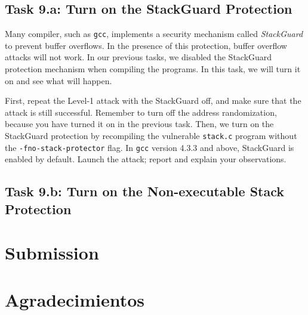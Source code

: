 \subsection{Task 9.a: Turn on the StackGuard Protection}

Many compiler, such as \texttt{gcc}, implements a security mechanism called
\textit{StackGuard} to prevent buffer overflows. In the presence of this
protection, buffer overflow attacks will not work.
In our previous tasks, we disabled the StackGuard protection mechanism
when compiling the programs. In this task, we will turn it on and
see what will happen.

First, repeat the Level-1 attack with the StackGuard off, and make sure that the
attack is still successful. Remember to turn off the address randomization, because
you have turned it on in the previous task.
Then, we turn on the StackGuard protection by
recompiling the vulnerable \texttt{stack.c} program without the
\texttt{-fno-stack-protector} flag.
In \texttt{gcc} version 4.3.3 and above, StackGuard is enabled by
default. Launch the attack; report and explain your observations.



\subsection{Task 9.b: Turn on the Non-executable Stack Protection}





\section{Submission}




\section*{Agradecimientos}




